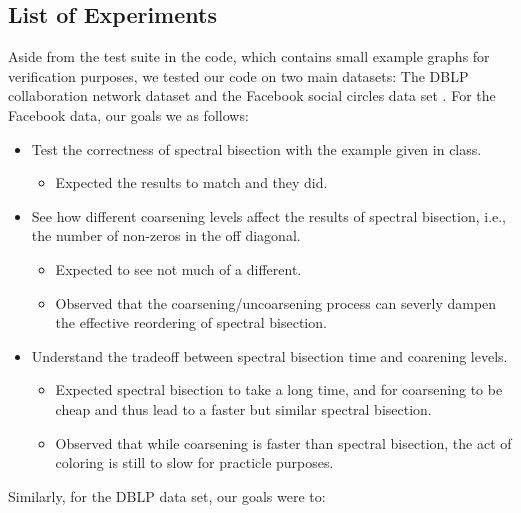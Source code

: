 \documentclass[11pt]{article}
\newcommand{\noi}{\noindent}
\begin{document}
\subsection{List of Experiments}

Aside from the test suite in the code, which contains small example graphs
for verification purposes, we tested our code on two main datasets: The DBLP
collaboration network dataset and the Facebook social circles data set
\cite{snapnets,facebook,dblp}. For the Facebook data, our goals we as follows: 

\begin{itemize}
	\item Test the correctness of spectral bisection with the example given in
		class. 
		\begin{itemize}
			\item Expected the results to match and they did.
		\end{itemize}
	\item See how different coarsening levels affect the results of spectral bisection,
		i.e., the number of non-zeros in the off diagonal. 
		\begin{itemize}
			\item Expected to see not much of a different. 
			\item Observed that the coarsening/uncoarsening process can
				severly dampen the effective reordering of
				spectral bisection.
		\end{itemize}
	\item Understand the tradeoff between spectral bisection time and
		coarening levels. 
		\begin{itemize}
			\item Expected spectral bisection to take a long time,
				and for coarsening to be cheap and thus lead to
				a faster but similar spectral bisection. 
			\item Observed that while coarsening is faster than
				spectral bisection, the act of coloring is still
				to slow for practicle purposes.
		\end{itemize}
\end{itemize}
\noi Similarly, for the DBLP data set, our goals were to: 
\end{document}
